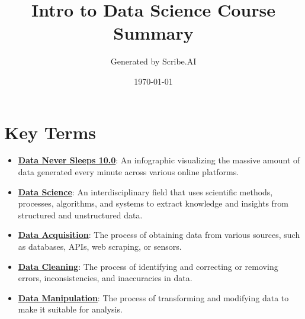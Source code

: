 \documentclass{article}%
\title{Intro to Data Science Course Summary}%
\author{Generated by Scribe.AI}%
\date{\today}%
\begin{document}
%
\normalsize%
\maketitle%
\section{Key Terms}%
\label{sec:KeyTerms}%
\begin{itemize}[leftmargin=*]%
\item \href{https://purdue.brightspace.com/d2l/common/assets/pdfjs-d2l-dist/1.0.14-legacy/web/viewer.html?file=\%2Fcontent\%2Fenforced\%2F1095465-WL.202510.CS24200.LE1\%2F01L1-introduction.pdf\%3Fou\%3D1095465\&lang=en-us\&container=d2l-fileviewer-rendered-pdf\&fullscreen=d2l-fileviewer-rendered-pdf-dialog\&height=667#page=2}{\textbf{Data Never Sleeps 10.0}}: An infographic visualizing the massive amount of data generated every minute across various online platforms.%
\item \href{https://purdue.brightspace.com/d2l/common/assets/pdfjs-d2l-dist/1.0.14-legacy/web/viewer.html?file=\%2Fcontent\%2Fenforced\%2F1095465-WL.202510.CS24200.LE1\%2F01L1-introduction.pdf\%3Fou\%3D1095465\&lang=en-us\&container=d2l-fileviewer-rendered-pdf\&fullscreen=d2l-fileviewer-rendered-pdf-dialog\&height=667#page=3}{\textbf{Data Science}}: An interdisciplinary field that uses scientific methods, processes, algorithms, and systems to extract knowledge and insights from structured and unstructured data.%
\item \href{https://purdue.brightspace.com/d2l/common/assets/pdfjs-d2l-dist/1.0.14-legacy/web/viewer.html?file=\%2Fcontent\%2Fenforced\%2F1095465-WL.202510.CS24200.LE1\%2F01L1-introduction.pdf\%3Fou\%3D1095465\&lang=en-us\&container=d2l-fileviewer-rendered-pdf\&fullscreen=d2l-fileviewer-rendered-pdf-dialog\&height=667#page=4}{\textbf{Data Acquisition}}: The process of obtaining data from various sources, such as databases, APIs, web scraping, or sensors.%
\item \href{https://purdue.brightspace.com/d2l/common/assets/pdfjs-d2l-dist/1.0.14-legacy/web/viewer.html?file=\%2Fcontent\%2Fenforced\%2F1095465-WL.202510.CS24200.LE1\%2F01L1-introduction.pdf\%3Fou\%3D1095465\&lang=en-us\&container=d2l-fileviewer-rendered-pdf\&fullscreen=d2l-fileviewer-rendered-pdf-dialog\&height=667#page=4}{\textbf{Data Cleaning}}: The process of identifying and correcting or removing errors, inconsistencies, and inaccuracies in data.%
\item \href{https://purdue.brightspace.com/d2l/common/assets/pdfjs-d2l-dist/1.0.14-legacy/web/viewer.html?file=\%2Fcontent\%2Fenforced\%2F1095465-WL.202510.CS24200.LE1\%2F01L1-introduction.pdf\%3Fou\%3D1095465\&lang=en-us\&container=d2l-fileviewer-rendered-pdf\&fullscreen=d2l-fileviewer-rendered-pdf-dialog\&height=667#page=4}{\textbf{Data Manipulation}}: The process of transforming and modifying data to make it suitable for analysis.%

\end{itemize}
\end{document}

